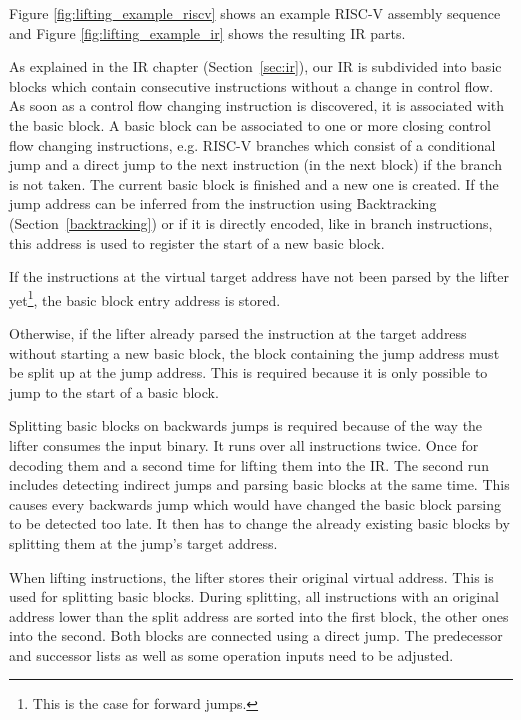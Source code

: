 \documentclass[course=eragp]{aspdoc}
\begin{document}
\par

Figure \ref{fig:lifting_example_riscv} shows an example RISC-V assembly sequence and Figure
\ref{fig:lifting_example_ir} shows the resulting IR parts.

\par

As explained in the IR chapter (Section~\ref{sec:ir}), our IR is subdivided into basic blocks which contain
consecutive instructions without a change in control flow. As soon as a control flow changing
instruction is discovered, it is associated with the basic block. A basic block can be
associated to one or more closing control flow changing
instructions, e.g. RISC-V branches which consist of a conditional
jump and a direct jump to the next instruction (in the next block) if the branch is not taken. The current basic block is finished and
a new one is created. If the jump address can be inferred from the instruction using
Backtracking (Section~\ref{backtracking}) or if it is directly encoded, like in branch instructions, this address is used
to register the start of a new basic block.

\par

If the instructions at the virtual target address have not been parsed by the lifter
yet\footnote{This is the case for forward jumps.}, the basic block entry address is stored.

Otherwise, if the lifter already parsed the instruction at the target address without starting a new
basic block, the block containing the jump address must be split up at the jump address.
This is required because it is only possible to jump to the start of a basic block.

\par

Splitting basic blocks on backwards jumps is required because of the way the lifter consumes the
input binary. It
runs over all instructions twice. Once for decoding them and a second time for lifting them into the
IR. The second run includes detecting indirect jumps and parsing basic blocks at the same time. This
causes every backwards jump which would have changed the basic block parsing to be detected too late. It then has to
change the already existing basic blocks by splitting them at the jump's target address.

\par

When lifting instructions, the lifter stores their original virtual address. This is used for
splitting basic blocks. During splitting, all instructions with an original address lower than the split address are
sorted into the first block, the other ones into the second. Both blocks are connected using a
direct jump. The predecessor and successor lists as well as some operation inputs need to be
adjusted.
\end{document}
